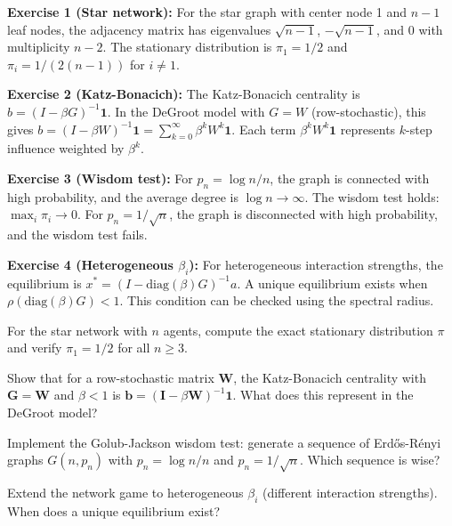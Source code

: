 \begin{solution}
\textbf{Exercise 1 (Star network):} For the star graph with center node 1 and $n-1$ leaf nodes, the adjacency matrix has eigenvalues $\sqrt{n-1}$, $-\sqrt{n-1}$, and $0$ with multiplicity $n-2$. The stationary distribution is $\pi_1 = 1/2$ and $\pi_i = 1/(2(n-1))$ for $i \neq 1$.
\end{solution}

\begin{solution}
\textbf{Exercise 2 (Katz-Bonacich):} The Katz-Bonacich centrality is $b = (I - \beta G)^{-1}\mathbf{1}$. In the DeGroot model with $G = W$ (row-stochastic), this gives $b = (I - \beta W)^{-1}\mathbf{1} = \sum_{k=0}^{\infty} \beta^k W^k \mathbf{1}$. Each term $\beta^k W^k \mathbf{1}$ represents $k$-step influence weighted by $\beta^k$.
\end{solution}

\begin{solution}
\textbf{Exercise 3 (Wisdom test):} For $p_n = \log n / n$, the graph is connected with high probability, and the average degree is $\log n \to \infty$. The wisdom test holds: $\max_i \pi_i \to 0$. For $p_n = 1/\sqrt{n}$, the graph is disconnected with high probability, and the wisdom test fails.
\end{solution}

\begin{solution}
\textbf{Exercise 4 (Heterogeneous $\beta_i$):} For heterogeneous interaction strengths, the equilibrium is $x^* = (I - \text{diag}(\beta) G)^{-1} a$. A unique equilibrium exists when $\rho(\text{diag}(\beta) G) < 1$. This condition can be checked using the spectral radius.
\end{solution}

\label{sec:spec:exercises}

\begin{exercise}
For the star network with $n$ agents, compute the exact stationary distribution $\pi$ and verify $\pi_1 = 1/2$ for all $n \ge 3$.
\end{exercise}

\begin{exercise}
Show that for a row-stochastic matrix $\bm{W}$, the Katz-Bonacich centrality with $\bm{G} = \bm{W}$ and $\beta < 1$ is $\bm{b} = (\bm{I} - \beta\bm{W})^{-1}\bm{1}$. What does this represent in the DeGroot model?
\end{exercise}

\begin{exercise}
Implement the Golub-Jackson wisdom test: generate a sequence of Erdős-Rényi graphs $G(n, p_n)$ with $p_n = \log n / n$ and $p_n = 1/\sqrt{n}$. Which sequence is wise?
\end{exercise}

\begin{exercise}[Research]
Extend the network game to heterogeneous $\beta_i$ (different interaction strengths). When does a unique equilibrium exist?
\end{exercise}
